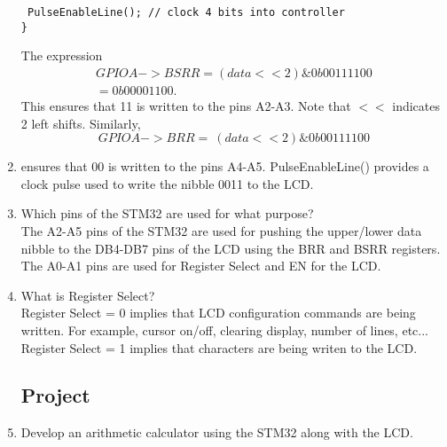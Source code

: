 \documentclass[journal,12pt,twocolumn]{IEEEtran}
\renewcommand\thesection{\arabic{section}}
\renewcommand\thesubsection{\thesection.\arabic{subsection}}
\begin{document}
\begin{enumerate}[label=\thesubsection.\arabic*.,ref=\thesubsection.\theenumi]
\begin{lstlisting}
 PulseEnableLine(); // clock 4 bits into controller
}
\end{lstlisting}
The expression
\begin{multline}
GPIOA->BSRR = (data << 2) \& 0b00111100 
\\
= 0b00001100.  
\end{multline}
This ensures that 11 is written to the pins A2-A3.  Note that $<<$ indicates 2 left shifts. Similarly, 
\begin{equation}
GPIOA->BRR = ~(data << 2) \& 0b00111100
\end{equation}
\item ensures that 00 is written to the pins A4-A5. PulseEnableLine() provides a clock pulse used
to write the nibble 0011 to the LCD.
\item Which pins of the STM32 are used for what purpose?
\\
\solution The A2-A5 pins of the STM32 are used for pushing the upper/lower data nibble to the DB4-DB7 pins
of the LCD using the BRR and BSRR registers.   The A0-A1 pins are used for Register Select and EN for the LCD.
\item What is Register Select?
\\
\solution Register Select = 0 implies that LCD configuration commands are being written. For example, cursor on/off, clearing
display, number of lines, etc... Register Select = 1 implies that
characters are being writen to the LCD.
\subsection{Project}
\item Develop an arithmetic calculator using the STM32 along with the LCD.
\end{enumerate}
\end{document}

